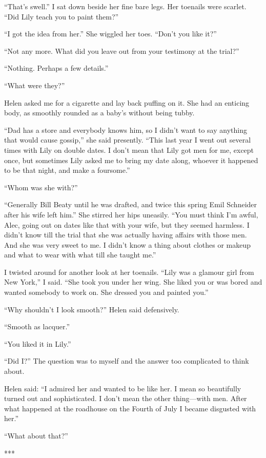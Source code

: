 {“That’s swell.” I sat down beside her fine bare legs. Her toenails were scarlet. “Did Lily teach you to paint them?”

“I got the idea from her.” She wiggled her toes. “Don’t you like it?”

“Not any more. What did you leave out from your testimony at the trial?”

“Nothing. Perhaps a few details.”

“What were they?”

Helen asked me for a cigarette and lay back puffing on it. She had an enticing body, as smoothly rounded as a baby’s without being tubby.

“Dad has a store and everybody knows him, so I didn’t want to say anything that would cause gossip,” she said presently. “This last year I went out several times with Lily on double dates. I don’t mean that Lily got men for me, except once, but sometimes Lily asked me to bring my date along, whoever it happened to be that night, and make a foursome.”

“Whom was she with?”

“Generally Bill Beaty until he was drafted, and twice this spring Emil Schneider after his wife left him.” She stirred her hips uneasily. “You must think I’m awful, Alec, going out on dates like that with your wife, but they seemed harmless. I didn’t know till the trial that she was actually having affairs with those men. And she was very sweet to me. I didn’t know a thing about clothes or makeup and what to wear with what till she taught me.”

I twisted around for another look at her toenails. “Lily was a glamour girl from New York,” I said. “She took you under her wing. She liked you or was bored and wanted somebody to work on. She dressed you and painted you.”

“Why shouldn’t I look smooth?” Helen said defensively.

“Smooth as lacquer.”

“You liked it in Lily.”

“Did I?” The question was to myself and the answer too complicated to think about.

Helen said: “I admired her and wanted to be like her. I mean so beautifully turned out and sophisticated. I don’t mean the other thing—with men. After what happened at the roadhouse on the Fourth of July I became disgusted with her.”

“What about that?”

***

}

